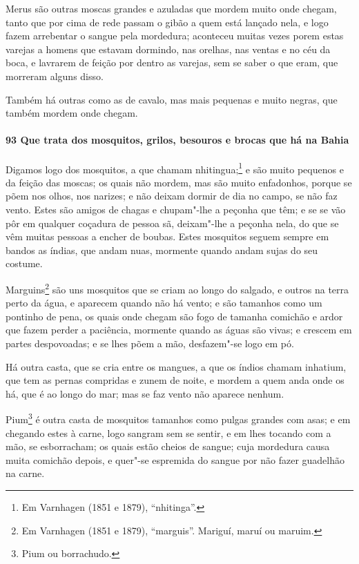 \begin{linenumbers}
Merus são outras moscas grandes e azuladas que mordem muito onde chegam, tanto que por
cima de rede passam o gibão a quem está lançado nela, e logo fazem arrebentar o sangue
pela mordedura; aconteceu muitas vezes porem estas varejas a homens que estavam dormindo,
nas orelhas, nas ventas e no céu da boca, e lavrarem de feição por dentro as varejas, sem
se saber o que eram, que morreram alguns disso.

Também há outras como as de cavalo, mas mais pequenas e muito negras, que também mordem
onde chegam.

\paragraph{93 Que trata dos mosquitos, grilos, besouros e brocas que há na Bahia}\quad
Digamos logo dos mosquitos, a que chamam nhitingua;\footnote{ Em Varnhagen (1851 e 1879),
``nhitinga''.} e são muito pequenos e da feição das moscas; os quais não mordem, mas são
muito enfadonhos, porque se põem nos olhos, nos narizes; e não deixam dormir de dia no
campo, se não faz vento. Estes são amigos de chagas e chupam"-lhe a peçonha que têm; e se
se vão pôr em qualquer coçadura de pessoa sã, deixam"-lhe a peçonha nela, do que se vêm
muitas pessoas a encher de boubas. Estes mosquitos seguem sempre em bandos as índias, que
andam nuas, mormente quando andam sujas do seu costume.

Marguins\footnote{ Em Varnhagen (1851 e 1879), ``marguis''. Mariguí, maruí ou maruim.} são
uns mosquitos que se criam ao longo do salgado, e outros na terra perto da água, e
aparecem quando não há vento; e são tamanhos como um pontinho de pena, os quais onde
chegam são fogo de tamanha comichão e ardor que fazem perder a paciência, mormente quando
as águas são vivas; e crescem em partes despovoadas; e se lhes põem a mão, desfazem"-se
logo em pó.

Há outra casta, que se cria entre os mangues, a que os índios chamam inhatium, que tem as
pernas compridas e zunem de noite, e mordem a quem anda onde os há, que é ao longo do mar;
mas se faz vento não aparece nenhum.

Pium\footnote{ Pium ou borrachudo.} é outra casta de mosquitos tamanhos como pulgas
grandes com asas; e em chegando estes à carne, logo sangram sem se sentir, e em lhes
tocando com a mão, se esborracham; os quais estão cheios de sangue; cuja mordedura causa
muita comichão depois, e quer"-se espremida do sangue por não fazer guadelhão na carne.



\end{linenumbers}
